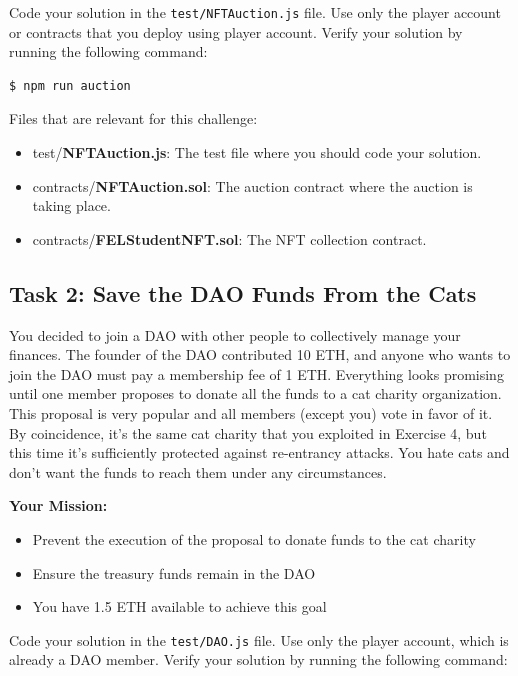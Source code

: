 \documentclass[12pt]{article}
\begin{document}
\noindent
Code your solution in the \texttt{test/NFTAuction.js} file. Use only the player account or contracts that you deploy using player account. Verify your solution by running the following command:

\begin{verbatim}
$ npm run auction
\end{verbatim}

\noindent
Files that are relevant for this challenge:
\begin{itemize}
\item test/\textbf{NFTAuction.js}: The test file where you should code your solution.
\item contracts/\textbf{NFTAuction.sol}: The auction contract where the auction is taking place.
\item contracts/\textbf{FELStudentNFT.sol}: The NFT collection contract.
\end{itemize}

\subsection*{Task 2: Save the DAO Funds From the Cats}

You decided to join a DAO with other people to collectively manage your finances. The founder of the DAO contributed 10 ETH, and anyone who wants to join the DAO must pay a membership fee of 1 ETH. Everything looks promising until one member proposes to donate all the funds to a cat charity organization. This proposal is very popular and all members (except you) vote in favor of it. By coincidence, it's the same cat charity that you exploited in Exercise 4, but this time it's sufficiently protected against re-entrancy attacks. You hate cats and don't want the funds to reach them under any circumstances.

\medskip
\noindent
\textbf{Your Mission:}
\begin{itemize}
  \item Prevent the execution of the proposal to donate funds to the cat charity
  \item Ensure the treasury funds remain in the DAO
  \item You have 1.5 ETH available to achieve this goal
\end{itemize}


\noindent
Code your solution in the \texttt{test/DAO.js} file. Use only the player account, which is already a DAO member.  Verify your solution by running the following command:
\end{document}
